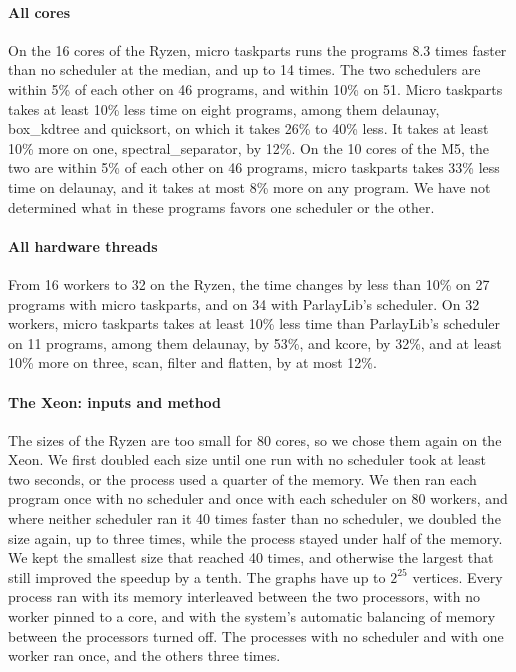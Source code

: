 \documentclass[sigplan,nonacm]{acmart}
\begin{document}
\paragraph{All cores}
%
On the 16 cores of the Ryzen, micro taskparts runs the programs 8.3
times faster than no scheduler at the median, and up to 14 times.
%
The two schedulers are within 5\% of each other on 46 programs, and
within 10\% on 51.
%
Micro taskparts takes at least 10\% less time on eight programs, among
them delaunay, box\_kdtree and quicksort, on which it takes 26\% to
40\% less.
%
It takes at least 10\% more on one, spectral\_separator, by 12\%.
%
On the 10 cores of the M5, the two are within 5\% of each other on 46
programs, micro taskparts takes 33\% less time on delaunay, and it
takes at most 8\% more on any program.
%
We have not determined what in these programs favors one scheduler
or the other.

\paragraph{All hardware threads}
%
From 16 workers to 32 on the Ryzen, the time changes by less than 10\%
on 27 programs with micro taskparts, and on 34 with ParlayLib's
scheduler.
%
On 32 workers, micro taskparts takes at least 10\% less time than
ParlayLib's scheduler on 11 programs, among them delaunay, by 53\%,
and kcore, by 32\%, and at least 10\% more on three, scan, filter and
flatten, by at most 12\%.

\paragraph{The Xeon: inputs and method}
%
The sizes of the Ryzen are too small for 80 cores, so we chose them
again on the Xeon.
%
We first doubled each size until one run with no scheduler took at
least two seconds, or the process used a quarter of the memory.
%
We then ran each program once with no scheduler and once with each
scheduler on 80 workers, and where neither scheduler ran it 40 times
faster than no scheduler, we doubled the size again, up to three
times, while the process stayed under half of the memory.
%
We kept the smallest size that reached 40 times, and otherwise the
largest that still improved the speedup by a tenth.
%
The graphs have up to $2^{25}$ vertices.
%
Every process ran with its memory interleaved between the two
processors, with no worker pinned to a core, and with the system's
automatic balancing of memory between the processors turned off.
%
The processes with no scheduler and with one worker ran once, and
the others three times.
\end{document}
